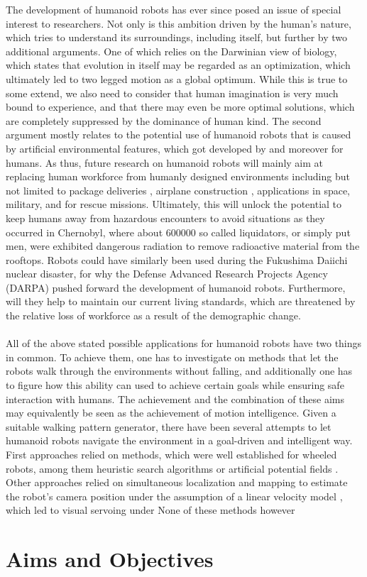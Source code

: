 \label{sec::1_in}
The development of humanoid robots has ever since posed an issue of special interest to researchers. Not only is this ambition driven by the human's nature, which tries to understand its surroundings, including itself, but further by two additional arguments. One of which relies on the Darwinian view of biology, which states that evolution in itself may be regarded as an optimization, which ultimately led to two legged motion as a global optimum. While this is true to some extend, we also need to consider that human imagination is very much bound to experience, and that there may even be more optimal solutions, which are completely suppressed by the dominance of human kind. The second argument mostly relates to the potential use of humanoid robots that is caused by artificial environmental features, which got developed by and moreover for humans. As thus, future research on humanoid robots will mainly aim at replacing human workforce from humanly designed environments including but not limited to package deliveries \cite{cassieford}, airplane construction \cite{stasse2014airbus}, applications in space, military, and for rescue missions. Ultimately, this will unlock the potential to keep humans away from hazardous encounters to avoid situations as they occurred in Chernobyl, where about 600000 \cite{kinly2006chernobyl} so called liquidators, or simply put men, were exhibited dangerous radiation to remove radioactive material from the rooftops. Robots could have similarly been used during the Fukushima Daiichi nuclear disaster, for why the Defense Advanced Research Projects Agency (DARPA) pushed forward the development of humanoid robots. Furthermore, will they help to maintain our current living standards, which are threatened by the relative loss of workforce as a result of the demographic change. \\\\
All of the above stated possible applications for humanoid robots have two things in common. To achieve them, one has to investigate on methods that let the robots walk through the environments without falling, and additionally one has to figure how this ability can used to achieve certain goals while ensuring safe interaction with humans. The achievement and the combination of these aims may equivalently be seen as the achievement of motion intelligence. Given a suitable walking pattern generator, there have been several attempts to let humanoid robots navigate the environment in a goal-driven and intelligent way. First approaches relied on methods, which were well established for wheeled robots, among them heuristic search algorithms or artificial potential fields \cite{kuffner2005motion}. Other approaches relied on simultaneous localization and mapping to estimate the robot's camera position under the assumption of a linear velocity model \cite{stasse2008integrating}, which led to visual servoing under 
None of these methods however 


\cite{jouppi2017datacenter} %
\section{Aims and Objectives}
\label{sec::14_ao}

